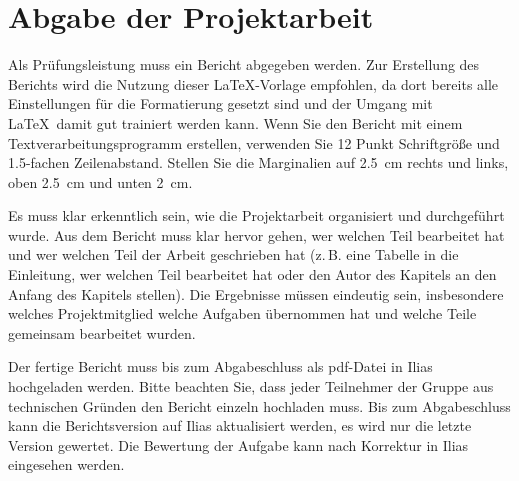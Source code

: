 \section{Abgabe der Projektarbeit}
Als Prüfungsleistung muss ein Bericht abgegeben werden. Zur Erstellung des Berichts wird die Nutzung dieser \LaTeX-Vorlage empfohlen, da dort bereits alle Einstellungen für die Formatierung gesetzt sind und der Umgang mit \LaTeX\ damit gut trainiert werden kann. Wenn Sie den Bericht mit einem Textverarbeitungsprogramm erstellen, verwenden Sie 12 Punkt Schriftgröße und \num{1,5}-fachen Zeilenabstand. Stellen Sie die Marginalien auf \SI{2,5}{\centi \meter} rechts und links, oben \SI{2,5}{\centi \meter} und unten \SI{2}{\centi \meter}.

Es muss klar erkenntlich sein, wie die Projektarbeit organisiert und durchgeführt wurde. Aus dem Bericht muss klar hervor gehen, wer welchen Teil bearbeitet hat und wer welchen Teil der Arbeit geschrieben hat (z.\,B. eine Tabelle in die Einleitung, wer welchen Teil bearbeitet hat oder den Autor des Kapitels an den Anfang des Kapitels stellen). Die Ergebnisse müssen eindeutig sein, insbesondere welches Projektmitglied welche Aufgaben übernommen hat und welche Teile gemeinsam bearbeitet wurden.

Der fertige Bericht muss bis zum Abgabeschluss als pdf-Datei in Ilias hochgeladen werden. Bitte beachten Sie, dass jeder Teilnehmer der Gruppe aus technischen Gründen den Bericht einzeln hochladen muss. Bis zum Abgabeschluss kann die Berichtsversion auf Ilias aktualisiert werden, es wird nur die letzte Version gewertet. Die Bewertung der Aufgabe kann nach Korrektur in Ilias eingesehen werden.